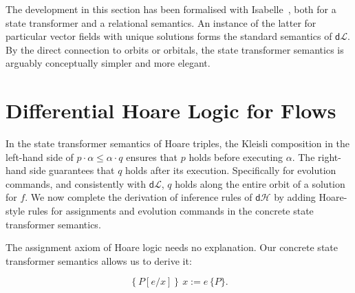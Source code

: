 \documentclass[envcountsame,envcountsect]{llncs}
\newcommand{\dL}{\mathsf{d}\mathcal{L}}
\newcommand{\dH}{\mathsf{d}\mathcal{H}}
\newcommand{\seq}{\mathop{\,;\,}}
\begin{document}
The development in this section has been formalised with
Isabelle~\cite{afp:hybrid,Foster18c-Optics,Foster19a-IsabelleUTP},
both for a state transformer and a relational semantics. An instance
of the latter for particular vector fields with unique solutions forms
the standard semantics of $\dL$. By the direct connection to orbits or
orbitals, the state transformer semantics is arguably conceptually
simpler and more elegant.



\section{Differential Hoare Logic for Flows}\label{sec:hoare-flow}

In the state transformer semantics of Hoare triples, the Kleisli
composition in the left-hand side of $p\cdot\alpha\le \alpha\cdot q$
ensures that $p$ holds before executing $\alpha$. The right-hand side
guarantees that $q$ holds after its execution. Specifically for
evolution commands, and consistently with $\dL$, $q$ holds along the
entire orbit of a solution for $f$. We now complete the derivation of
inference rules of $\dH$ by adding Hoare-style rules for assignments
and evolution commands in the concrete state transformer semantics.

The assignment axiom of Hoare logic needs no explanation. Our concrete
state transformer semantics allows us to derive it:

\begin{equation}
\left\{P[e/x]\right\}\,  x:=e\, \{P\}. \label{eq:h-assgn}\tag{h-assgn}
\end{equation}

\end{document}
